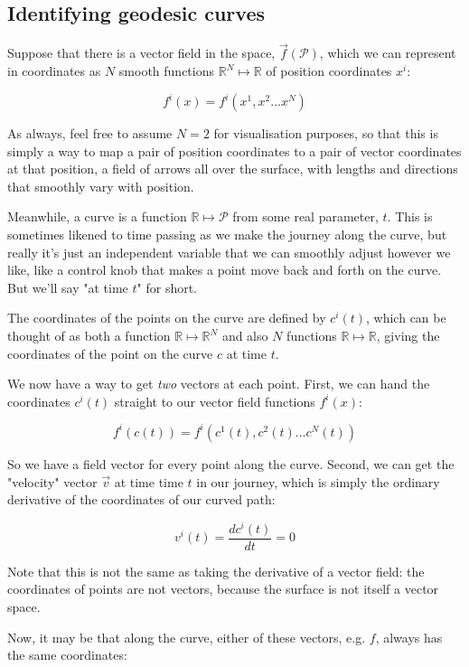 \subsection{Identifying geodesic curves}

Suppose that there is a vector field in the space, $\vec{f}(\mathcal{P})$, which we can represent in coordinates as $N$ smooth functions $\mathbb{R}^N \mapsto \mathbb{R}$ of position coordinates $x^i$:

$$
f^i(x) = f^i(x^1, x^2 \dots x^N)
$$

As always, feel free to assume $N = 2$ for visualisation purposes, so that this is simply a way to map a pair of position coordinates to a pair of vector coordinates at that position, a field of arrows all over the surface, with lengths and directions that smoothly vary with position.

Meanwhile, a curve is a function $\mathbb{R} \mapsto \mathcal{P}$ from some real parameter, $t$. This is sometimes likened to time passing as we make the journey along the curve, but really it's just an independent variable that we can smoothly adjust however we like, like a control knob that makes a point move back and forth on the curve. But we'll say "at time $t$" for short.

The coordinates of the points on the curve are defined by $c^i(t)$, which can be thought of as both a function $\mathbb{R} \mapsto \mathbb{R}^N$ and also $N$ functions $\mathbb{R} \mapsto \mathbb{R}$, giving the coordinates of the point on the curve $c$ at time $t$.

We now have a way to get \textit{two} vectors at each point. First, we can hand the coordinates $c^i(t)$ straight to our vector field functions $f^i(x)$:

$$
f^i(c(t)) = f^i(c^1(t), c^2(t) \dots c^N(t))
$$

So we have a field vector for every point along the curve. Second, we can get the "velocity" vector $\vec{v}$ at time time $t$ in our journey, which is simply the ordinary derivative of the coordinates of our curved path:

$$
v^i(t) = \frac{d c^i(t)}{dt} = 0
$$

Note that this is not the same as taking the derivative of a vector field: the coordinates of points are not vectors, because the surface is not itself a vector space.

Now, it may be that along the curve, either of these vectors, e.g. $f$, always has the same coordinates:

